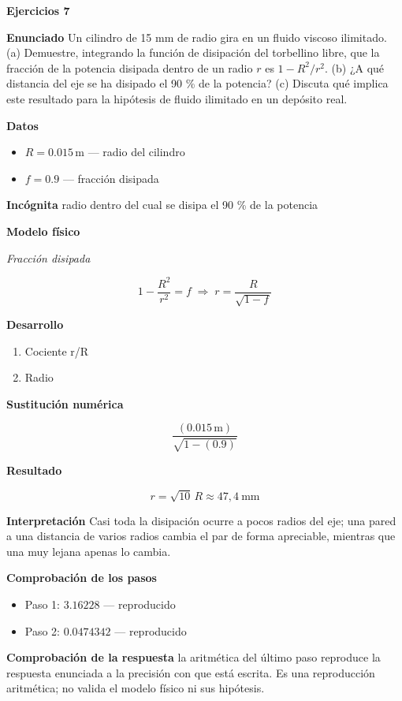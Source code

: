 \documentclass[10pt,openany]{book}
\begin{document}
\noindent\textbf{Ejercicios 7}

\noindent\textbf{Enunciado}
Un cilindro de 15 mm de radio gira en un fluido viscoso ilimitado. (a) Demuestre, integrando la función de disipación del torbellino libre, que la fracción de la potencia disipada dentro de un radio \(r\) es \(1 - R^{2}/r^{2}\). (b) ¿A qué distancia del eje se ha disipado el 90 \% de la potencia? (c) Discuta qué implica este resultado para la hipótesis de fluido ilimitado en un depósito real.

\noindent\textbf{Datos}
\begin{itemize}
\item $R = 0.015\,\mathrm{m}$ — radio del cilindro
\item $f = 0.9$ — fracción disipada
\end{itemize}

\noindent\textbf{Incógnita}
radio dentro del cual se disipa el 90 \% de la potencia

\noindent\textbf{Modelo físico}

\noindent\textit{Fracción disipada}

\[
1 - \frac{R^{2}}{r^{2}} = f \;\Rightarrow\; r = \frac{R}{\sqrt{1 - f}}
\]

\noindent\textbf{Desarrollo}
\begin{enumerate}
\item
Cociente r/R
\item
Radio
\end{enumerate}

\noindent\textbf{Sustitución numérica}

\[
\frac{\left(0.015\,\mathrm{m}\right)}{\sqrt{1 - \left(0.9\right)}}
\]

\noindent\textbf{Resultado}

\[
r = \sqrt{10}\,R \approx 47{,}4\ \mathrm{mm}
\]

\noindent\textbf{Interpretación}
Casi toda la disipación ocurre a pocos radios del eje; una pared a una distancia de varios radios cambia el par de forma apreciable, mientras que una muy lejana apenas lo cambia.

\noindent\textbf{Comprobación de los pasos}
\begin{itemize}
\item Paso 1: $3.16228$ — reproducido
\item Paso 2: $0.0474342$ — reproducido
\end{itemize}

\noindent\textbf{Comprobación de la respuesta} la aritmética del último paso reproduce la respuesta enunciada a la precisión con que está escrita. Es una reproducción aritmética; no valida el modelo físico ni sus hipótesis.
\end{document}
